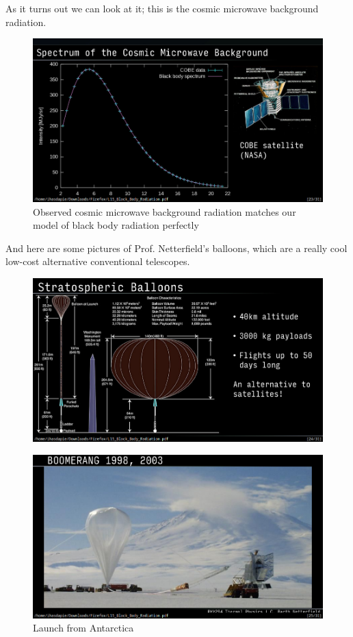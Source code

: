 \documentclass[10pt]{article}
\begin{document}
As it turns out we can look at it; this is the cosmic microwave background radiation.



\begin{figure}[H]
	\centering
	\includegraphics[width=0.8\linewidth]{img/image_2022-04-10-01-49-49.png}
	\caption{Observed cosmic microwave background radiation matches our model of black body radiation perfectly}
\end{figure}



And here are some pictures of Prof. Netterfield's balloons, which are a really cool low-cost alternative conventional telescopes.


\begin{figure}[H]
	\centering
	\includegraphics[width=0.8\linewidth]{img/image_2022-04-10-01-56-17.png}
\end{figure}

\begin{figure}[H]
	\centering
	\includegraphics[width=0.8\linewidth]{img/image_2022-04-10-01-57-28.png}
	\caption{Launch from Antarctica}
\end{figure}
\end{document}
